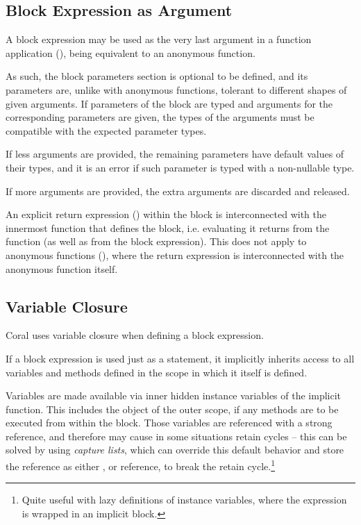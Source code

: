 \subsection{Block Expression as Argument}
\label{sec:block-arguments}

A block expression may be used as the very last argument in a function application (), being equivalent to an anonymous function. 

As such, the block parameters section is optional to be defined, and its parameters are, unlike with anonymous functions, tolerant to different shapes of given arguments. If parameters of the block are typed and arguments for the corresponding parameters are given, the types of the arguments must be compatible with the expected parameter types. 

If less arguments are provided, the remaining parameters have default values of their types, and it is an error if such parameter is typed with a non-nullable type. 

If more arguments are provided, the extra arguments are discarded and released. 

An explicit return expression () within the block is interconnected with the innermost function that defines the block, i.e. evaluating it returns from the function (as well as from the block expression). This does not apply to anonymous functions (), where the return expression is interconnected with the anonymous function itself. 






\subsection{Variable Closure}
\label{sec:variable-closure}

Coral uses variable closure when defining a block expression. 

If a block expression is used just as a statement, it implicitly inherits access to all variables and methods defined in the scope in which it itself is defined. 

Variables are made available via inner hidden instance variables of the implicit function. This includes the  object of the outer scope, if any methods are to be executed from within the block. Those variables are referenced with a strong reference, and therefore may cause in some situations retain cycles -- this can be solved by using {\em capture lists}, which can override this default behavior and store the reference as either ,  or  reference, to break the retain cycle.\footnote{Quite useful with lazy definitions of instance variables, where the expression is wrapped in an implicit block.} 

